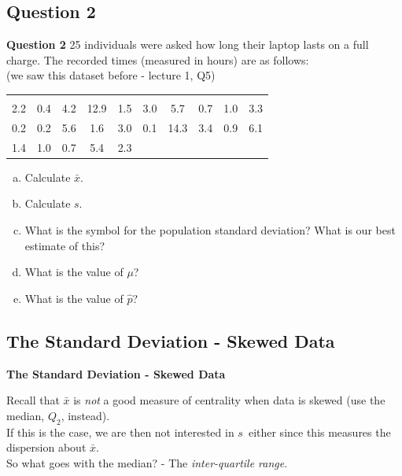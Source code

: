 \documentclass[compress]{beamer}        %
\makeatletter
\newcommand{\tcb}{\textcolor{beamer@blendedblue}}
\makeatother
\begin{document}
\subsection{Question 2}
\begin{frame}{\bf \tcb{Question 2}}
25 individuals were asked how long their laptop lasts on a full charge. The recorded times (measured in hours) are as follows:\\
{\footnotesize(we saw this dataset before - lecture 1, Q5)}
\begin{center}
\begin{tabular}{|cccccccccc|}
\hline
&&&&&&&&&\\[-0.4cm]
2.2 & 0.4 & 4.2 & 12.9 & 1.5 & 3.0 & 5.7  & 0.7 & 1.0 & 3.3 \\
0.2 & 0.2 & 5.6 &  1.6 & 3.0 & 0.1 & 14.3 & 3.4 & 0.9 & 6.1 \\
1.4 & 1.0 & 0.7 & 5.4  & 2.3 &&&&&\\
\hline
\end{tabular}
\end{center}
\begin{enumerate}[a)]\itemsep0.3cm
\item Calculate $\bar x$.
\item Calculate $s$.
\item What is the symbol for the population standard deviation? What is our best estimate of this?
\item What is the value of $\mu$?
\item What is the value of $\hat p$?
\end{enumerate}
\end{frame}

\subsection{The Standard Deviation - Skewed Data}
\begin{frame}{\bf \tcb{The Standard Deviation - Skewed Data}}

Recall that $\bar x$ is \emph{not} a good measure of centrality when data is skewed (use the median, $Q_2$, instead).\\[0.6cm]
If this is the case, we are then not interested in $s$\, either since this measures the dispersion about $\bar x$.\\[1cm]
So what goes with the median? - The \emph{inter-quartile range}.


\end{frame}
\end{document}
